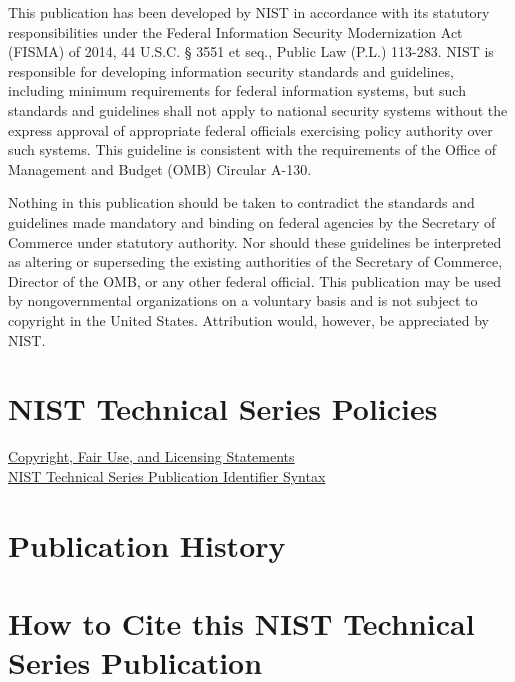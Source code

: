 This publication has been developed by NIST in accordance with its statutory responsibilities under the Federal Information Security Modernization Act (FISMA) of 2014, 44 U.S.C. § 3551 et seq., Public Law (P.L.) 113-283. NIST is responsible for developing information security standards and guidelines, including minimum requirements for federal information systems, but such standards and guidelines shall not apply to national security systems without the express approval of appropriate federal officials exercising policy authority over such systems. This guideline is consistent with the requirements of the Office of Management and Budget (OMB) Circular A-130.

Nothing in this publication should be taken to contradict the standards and guidelines made mandatory and binding on federal agencies by the Secretary of Commerce under statutory authority. Nor should these guidelines be interpreted as altering or superseding the existing authorities of the Secretary of Commerce, Director of the OMB, or any other federal official.  This publication may be used by nongovernmental organizations on a voluntary basis and is not subject to copyright in the United States. Attribution would, however, be appreciated by NIST. 


\section*{NIST Technical Series Policies}

\href{https://doi.org/10.6028/NIST-TECHPUBS.CROSSMARK-POLICY}{Copyright, Fair Use, and Licensing Statements} \\
\href{https://www.nist.gov/nist-research-library/nist-technical-series-publications-author-instructions\#pubid}{NIST Technical Series Publication Identifier Syntax}


\section*{Publication History}




\section*{How to Cite this NIST Technical Series Publication}

